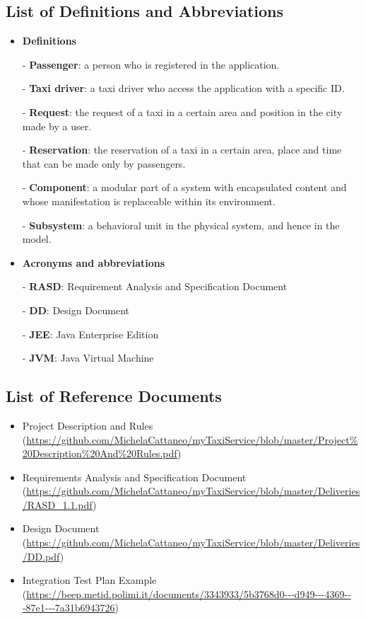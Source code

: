 \documentclass[18pt,oneside,a4paper, titlepage]{article}
\begin{document}
	\subsection{List of	Definitions	and	Abbreviations}
		\begin{itemize}
			\item \textbf{Definitions}
			\item[-] \textbf{Passenger}: a person who is registered in the application.
			\item[-] \textbf{Taxi driver}: a taxi driver who access the application with a specific ID.
			\item[-] \textbf{Request}: the request of a taxi in a certain area and position in the city made by a user.
			\item[-] \textbf{Reservation}: the reservation of a taxi in a certain area, place and time that can be made only by passengers.
			\item[-] \textbf{Component}: a modular part of a system with encapsulated content and whose manifestation is replaceable within its environment.
			\item[-] \textbf{Subsystem}: a behavioral unit in the physical system, and hence in the model.
		\newpage	
			\item \textbf{Acronyms and abbreviations}
			\item[-] \textbf{RASD}: Requirement Analysis and Specification Document
			\item[-] \textbf{DD}: Design Document
			\item[-] \textbf{JEE}: Java Enterprise Edition
			\item[-] \textbf{JVM}: Java Virtual Machine
			
		\end{itemize}
	\subsection{List of	Reference Documents}
		\begin{itemize}
			\item Project Description and Rules (\url{https://github.com/MichelaCattaneo/myTaxiService/blob/master/Project\%20Description\%20And\%20Rules.pdf})
			\item Requirements Analysis and Specification Document (\url{https://github.com/MichelaCattaneo/myTaxiService/blob/master/Deliveries/RASD_1.1.pdf})
			\item Design Document (\url{https://github.com/MichelaCattaneo/myTaxiService/blob/master/Deliveries/DD.pdf})
			\item Integration Test Plan Example (\url{https://beep.metid.polimi.it/documents/3343933/5b3768d0-­‐‑d949-­‐‑4369-­‐‑87e1-­‐‑7a31b6943726})
		\end{itemize}
\end{document}
